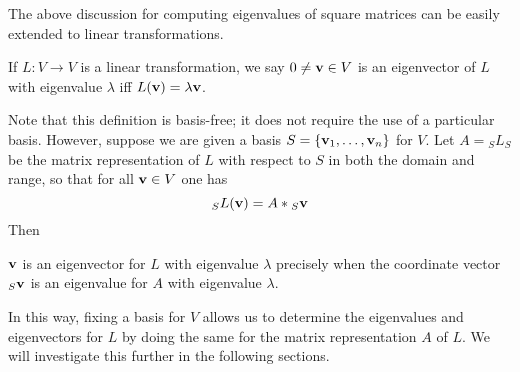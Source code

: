 \documentclass{ximera}
\begin{document}
The above discussion for computing eigenvalues of square matrices can be easily extended to linear transformations.

\begin{definition} If $L:V\to V$ is a linear transformation, we say $0\ne {\bf v}\in V$ is an eigenvector of $L$ with eigenvalue $\lambda$ iff $L({\bf v}) = \lambda{\bf v}$.
\end{definition}

Note that this definition is basis-free; it does not require the use of a particular basis. However, suppose we are given a basis $S = \{{\bf v}_1,\dots,{\bf v}_n\}$ for $V$. Let $A = {}_{S}L_{S}$ be the matrix representation of $L$ with respect to $S$ in both the domain and range, so that for all ${\bf v}\in V$ one has
\[
{}_{S}L({\bf v}) = A*{}_{S}{\bf v}
\]
Then 

\begin{proposition} ${\bf v}$ is an eigenvector for $L$ with eigenvalue $\lambda$ precisely when the coordinate vector ${}_{S}{\bf v}$ is an eigenvalue for $A$ with eigenvalue $\lambda$.
\end{proposition}

In this way, fixing a basis for $V$ allows us to determine the eigenvalues and eigenvectors for $L$ by doing the same for the matrix representation $A$ of $L$. We will investigate this further in the following sections.
\end{document}
